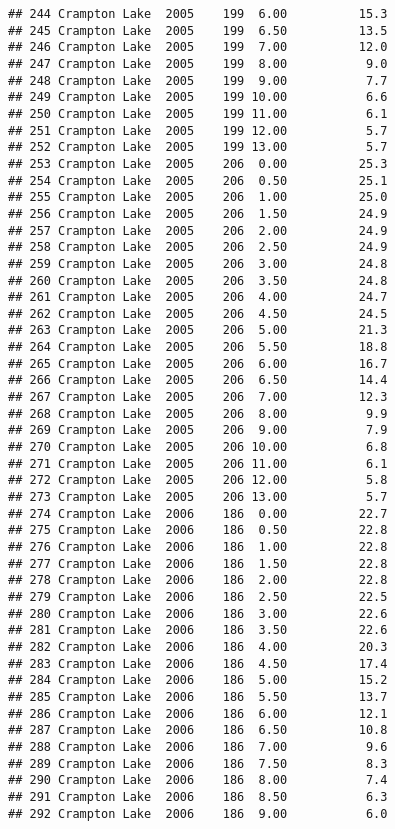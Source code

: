 \documentclass[
]{article}
\begin{document}
\begin{verbatim}
## 244 Crampton Lake  2005    199  6.00          15.3
## 245 Crampton Lake  2005    199  6.50          13.5
## 246 Crampton Lake  2005    199  7.00          12.0
## 247 Crampton Lake  2005    199  8.00           9.0
## 248 Crampton Lake  2005    199  9.00           7.7
## 249 Crampton Lake  2005    199 10.00           6.6
## 250 Crampton Lake  2005    199 11.00           6.1
## 251 Crampton Lake  2005    199 12.00           5.7
## 252 Crampton Lake  2005    199 13.00           5.7
## 253 Crampton Lake  2005    206  0.00          25.3
## 254 Crampton Lake  2005    206  0.50          25.1
## 255 Crampton Lake  2005    206  1.00          25.0
## 256 Crampton Lake  2005    206  1.50          24.9
## 257 Crampton Lake  2005    206  2.00          24.9
## 258 Crampton Lake  2005    206  2.50          24.9
## 259 Crampton Lake  2005    206  3.00          24.8
## 260 Crampton Lake  2005    206  3.50          24.8
## 261 Crampton Lake  2005    206  4.00          24.7
## 262 Crampton Lake  2005    206  4.50          24.5
## 263 Crampton Lake  2005    206  5.00          21.3
## 264 Crampton Lake  2005    206  5.50          18.8
## 265 Crampton Lake  2005    206  6.00          16.7
## 266 Crampton Lake  2005    206  6.50          14.4
## 267 Crampton Lake  2005    206  7.00          12.3
## 268 Crampton Lake  2005    206  8.00           9.9
## 269 Crampton Lake  2005    206  9.00           7.9
## 270 Crampton Lake  2005    206 10.00           6.8
## 271 Crampton Lake  2005    206 11.00           6.1
## 272 Crampton Lake  2005    206 12.00           5.8
## 273 Crampton Lake  2005    206 13.00           5.7
## 274 Crampton Lake  2006    186  0.00          22.7
## 275 Crampton Lake  2006    186  0.50          22.8
## 276 Crampton Lake  2006    186  1.00          22.8
## 277 Crampton Lake  2006    186  1.50          22.8
## 278 Crampton Lake  2006    186  2.00          22.8
## 279 Crampton Lake  2006    186  2.50          22.5
## 280 Crampton Lake  2006    186  3.00          22.6
## 281 Crampton Lake  2006    186  3.50          22.6
## 282 Crampton Lake  2006    186  4.00          20.3
## 283 Crampton Lake  2006    186  4.50          17.4
## 284 Crampton Lake  2006    186  5.00          15.2
## 285 Crampton Lake  2006    186  5.50          13.7
## 286 Crampton Lake  2006    186  6.00          12.1
## 287 Crampton Lake  2006    186  6.50          10.8
## 288 Crampton Lake  2006    186  7.00           9.6
## 289 Crampton Lake  2006    186  7.50           8.3
## 290 Crampton Lake  2006    186  8.00           7.4
## 291 Crampton Lake  2006    186  8.50           6.3
## 292 Crampton Lake  2006    186  9.00           6.0

\end{verbatim}
\end{document}

